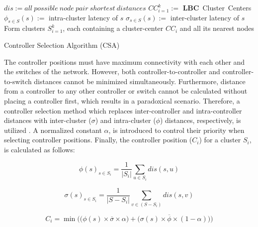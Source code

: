 \documentclass[journal]{IEEEtran}
\begin{document}
\begin{algorithm}
	\SetAlgoLined
	$dis := all~possible~node~pair~shortest~distances$\;
	$CC_{i=1}^k :=$ \textbf{LBC}~Cluster~Centers\;
	$\phi_{s\in S}(s) :=$ intra-cluster latency of $s$\;
	$\sigma_{s\in S}(s) :=$ inter-cluster latency of $s$\;
	Form clusters $S_{i=1}^k$, each containing a cluster-center $CC_i$ and all its nearest nodes\;
	\caption{Controller Selection Algorithm (CSA)} \label{algo:csa}
\end{algorithm}

The controller positions must have maximum connectivity with each other and the switches of the network. However, both controller-to-controller and controller-to-switch distances cannot be minimized simultaneously. Furthermore, distance from a controller to any other controller or switch cannot be calculated without placing a controller first, which results in a paradoxical scenario. Therefore, a controller selection method which replaces inter-controller and intra-controller distances with inter-cluster ($\sigma$) and intra-cluster ($\phi$) distances, respectively, is utilized \cite{aziz2019degree}. A normalized constant $\alpha$, is introduced to control their priority when selecting controller positions. Finally, the controller position ($C_i$) for a cluster $S_i$, is calculated as follows:

\begin{equation} \label{eqn:intra}
\phi(s)_{s\in S_i} = \frac{1}{|S_i|}\sum_{u\in S_i} dis(s,u)
\end{equation}

\begin{equation} \label{eqn:inter}
\sigma(s)_{s\in S_i} = \frac{1}{|S-S_i|}\sum_{v\in (S-S_i)} dis(s,v)
\end{equation}

\begin{equation} \label{eqn:totlat}
C_i = \min\bigg(\big( \phi(s)\times \overline{\sigma} \times \alpha \big) + \big( \sigma(s) \times \overline{\phi} \times (1-\alpha) \big) \bigg)
\end{equation}
\end{document}
